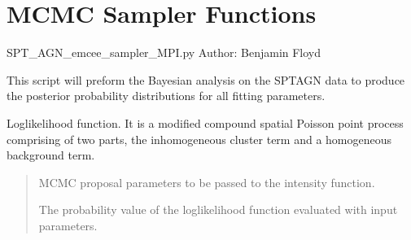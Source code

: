 \documentclass[letterpaper,12pt,english]{sphinxmanual}
\begin{document}
\section{MCMC Sampler Functions}
\label{\detokenize{api/fitting:module-SPTclIRAGN.SPT_AGN_emcee_sampler_MPI}}\label{\detokenize{api/fitting:mcmc-sampler-functions}}
\sphinxAtStartPar
SPT\_AGN\_emcee\_sampler\_MPI.py
Author: Benjamin Floyd

\sphinxAtStartPar
This script will preform the Bayesian analysis on the SPT\sphinxhyphen{}AGN data to produce the posterior probability distributions
for all fitting parameters.

\begin{fulllineitems}
\label{\detokenize{api/fitting:SPTclIRAGN.SPT_AGN_emcee_sampler_MPI.lnlike}}
\pysigstartsignatures
{}
\pysigstopsignatures
\sphinxAtStartPar
Log\sphinxhyphen{}likelihood function. It is a modified compound spatial Poisson point process comprising of two parts, the
inhomogeneous cluster term and a homogeneous background term.
\begin{quote}\begin{description}
\sphinxAtStartPar
{} \textendash{} MCMC proposal parameters to be passed to the intensity function.

\sphinxAtStartPar
The probability value of the log\sphinxhyphen{}likelihood function evaluated with input parameters.

\sphinxAtStartPar
{}

\end{description}\end{quote}

\end{fulllineitems}
\end{document}
